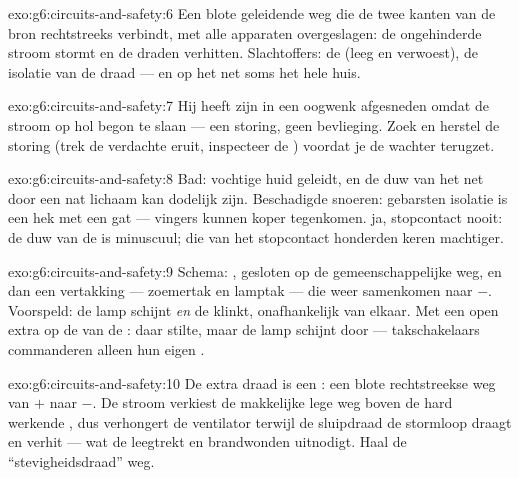 \begin{solution}{exo:g6:circuits-and-safety:6}
Een blote geleidende weg die de twee kanten van de bron rechtstreeks
verbindt, met alle apparaten overgeslagen: de ongehinderde stroom
stormt en de draden verhitten. Slachtoffers: de  (leeg en
verwoest), de isolatie van de draad --- en op het net soms het hele
huis.
\end{solution}

\begin{solution}{exo:g6:circuits-and-safety:7}
Hij heeft zijn  in een oogwenk afgesneden omdat de stroom op hol
begon te slaan --- een storing, geen bevlieging. Zoek en herstel de
storing (trek de verdachte eruit, inspecteer de ) voordat je de
wachter terugzet.
\end{solution}

\begin{solution}{exo:g6:circuits-and-safety:8}
Bad: vochtige huid geleidt, en de duw van het net door een nat lichaam
kan dodelijk zijn. Beschadigde snoeren: gebarsten isolatie is een hek
met een gat --- vingers kunnen koper tegenkomen.  ja,
stopcontact nooit: de duw van de  is minuscuul; die van het
stopcontact honderden keren machtiger.
\end{solution}

\begin{solution}{exo:g6:circuits-and-safety:9}
Schema: , gesloten  op de gemeenschappelijke weg, en
dan een vertakking --- zoemertak en lamptak --- die weer
samenkomen naar $-$. Voorspeld: de lamp schijnt \emph{en} de
 klinkt, onafhankelijk van elkaar. Met een open extra
 op de  van de : daar stilte, maar de lamp
schijnt door --- takschakelaars commanderen alleen hun eigen
.
\end{solution}

\begin{solution}{exo:g6:circuits-and-safety:10}
De extra draad is een : een blote rechtstreekse weg van
$+$ naar $-$. De stroom verkiest de makkelijke lege weg boven de hard
werkende , dus verhongert de ventilator terwijl de sluipdraad de
stormloop draagt en verhit --- wat de  leegtrekt en
brandwonden uitnodigt. Haal de ``stevigheidsdraad'' weg.
\end{solution}

